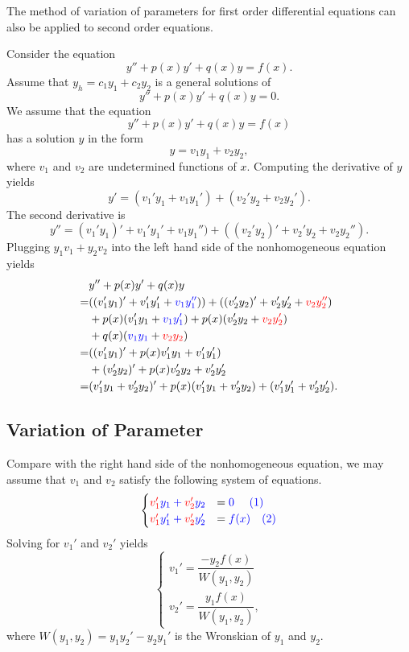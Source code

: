 The method of variation of parameters for first order differential equations can also be applied to second order equations.

Consider the equation
\[y''+ p(x)y' + q(x)y = f(x).\]
Assume that $y_h=c_1y_1+c_2y_2$ is a general solutions of  
\[y''+ p(x)y' + q(x)y = 0.\]
We assume that the equation
	\[y''+ p(x)y' + q(x)y = f(x)\]
has a solution $y$ in the form 
	\[y=v_1y_1+v_2y_2,\]
where $v_1$ and $v_2$ are undetermined functions of $x$. 
Computing the derivative of $y$ yields
\[y'=(v_1'y_1+v_1y_1')+(v_2'y_2+v_2y_2').\]
The second derivative is
\[y''=(v_1'y_1)'+v_1'y_1'+v_1y_1'')+((v_2'y_2)'+v_2'y_2+v_2y_2'').\]
Plugging $y_1v_1+y_2v_2$ into the left hand side of the nonhomogeneous equation yields
\[
\begin{aligned}
  &y''+p(x)y'+q(x)y\\
  =&((v_1'y_1)'+v_1'y_1'+{\color{blue} v_1y_1''}))+((v_2'y_2)'+v_2'y_2'+{\color{red} v_2y_2''})\\
  &+p(x)(v_1'y_1+{\color{blue} v_1y_1'})+p(x)(v_2'y_2+{\color{red} v_2y_2'})\\
  &+q(x)({\color{blue} v_1y_1}+{\color{red} v_2y_2})\\
  =&((v_1'y_1)'+p(x)v_1'y_1+ v_1'y_1')\\
  &+(v_2'y_2)'+p(x)v_2'y_2+ v_2'y_2'\\
  =& (v_1'y_1+v_2'y_2)'+p(x)(v_1'y_1+v_2'y_2)+(v_1'y_1'+v_2'y_2').
\end{aligned}  
\]

\subsection{Variation of Parameter}

Compare with the right hand side of the nonhomogeneous equation, we may assume that $v_1$ and $v_2$ satisfy the following system of equations.
	\[\begin{cases}
	\color{red}{v_1'}\color{blue}{y_1}+\color{red}{v_2'}\color{blue}{y_2}&=\color{blue}{0} ~\quad (1)\\
	\color{red}{v_1'}\color{blue}{y_1'}+\color{red}{v_2'}\color{blue}{y_2'}&=\color{blue}{f(x)} \quad (2)
	\end{cases}
	\] 
Solving for $v_1'$ and $v_2'$ yields
\begin{equation}
\begin{cases}
  v_{1}'=\dfrac{-y_{2} f(x)}{W(y_{1}, y_{2})}\\[1em]
  v_{2}'=\dfrac{y_{1} f(x)}{W(y_{1}, y_{2})},
\end{cases}  
  \label{eq:5-3-3-1}
\end{equation}
where $W(y_1, y_2)=y_1y_2'-y_2y_1'$ is the Wronskian of $y_1$ and $y_2$.

